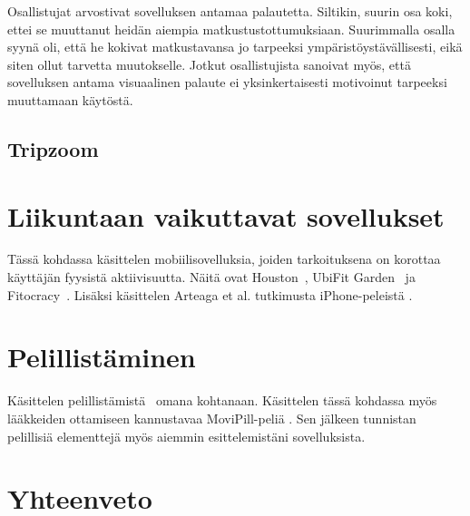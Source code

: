 \documentclass[finnish]{tktltiki2}
\theoremstyle{definition}
\theoremstyle{remark}
\begin{document}
Osallistujat arvostivat sovelluksen antamaa palautetta. Siltikin, suurin osa koki, ettei se muuttanut heidän aiempia matkustustottumuksiaan. Suurimmalla osalla syynä oli, että he kokivat matkustavansa jo tarpeeksi ympäristöystävällisesti, eikä siten ollut tarvetta muutokselle. Jotkut osallistujista sanoivat myös, että sovelluksen antama visuaalinen palaute ei yksinkertaisesti motivoinut tarpeeksi muuttamaan käytöstä.

\subsection{Tripzoom}



\section{Liikuntaan vaikuttavat sovellukset}

Tässä kohdassa käsittelen mobiilisovelluksia, joiden tarkoituksena on korottaa käyttäjän fyysistä aktiivisuutta.
Näitä ovat Houston~\cite{houston}, UbiFit Garden~\cite{ubifit} ja Fitocracy~\cite{fitocracy}.
Lisäksi käsittelen Arteaga et al. tutkimusta iPhone-peleistä \cite{obesity}.

\section{Pelillistäminen}

Käsittelen pelillistämistä~\cite{gamification} omana kohtanaan. Käsittelen tässä kohdassa myös lääkkeiden ottamiseen kannustavaa MoviPill-peliä \cite{movipill}.
Sen jälkeen tunnistan pelillisiä elementtejä myös aiemmin esittelemistäni sovelluksista.

\section{Yhteenveto}

%
%
% 
%







% 
\end{document}
